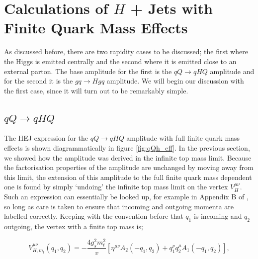 \section{Calculations of $H$ + Jets with Finite Quark Mass Effects}

As discussed before, there are two rapidity cases to be discussed; the first where the Higgs is emitted centrally and the second where it is emitted close to an external parton. The base amplitude for the first is the $qQ \to qHQ$ amplitude and for the second it is the $gq \to Hgq$ amplitude. We will begin our discussion with the first case, since it will turn out to be remarkably simple. 

\subsection{$qQ \to qHQ$}

The HEJ expression for the $qQ \to qHQ$ amplitude with full finite quark mass effects is shown diagrammatically in figure \ref{fig:qQh_eff}. In the previous section, we showed how the amplitude was derived in the infinite top mass limit. Because the factorisation properties of the amplitude are unchanged by moving away from this limit, the extension of this amplitude to the full finite quark mass dependent one is found by simply `undoing' the infinite top mass limit on the vertex $V_H^{\mu \nu}$. Such an expression can essentially be looked up, for example in Appendix B of \cite{Duca2003}, so long as care is taken to ensure that incoming and outgoing momenta are labelled correctly. Keeping with the convention before that $q_1$ is incoming and $q_2$ outgoing, the vertex with a finite top mass is;

\begin{equation}
V^{\mu \nu}_{H, m_t}(q_1, q_2) = -\frac{4 g_s^2 m_t^2}{v} \left[\eta^{\mu \nu}A_2(-q_1,q_2) + q_1^\nu q_2^\mu A_1(-q_1,q_2) \right],
\end{equation}

